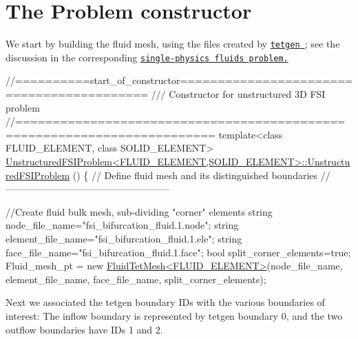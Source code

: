  

\hypertarget{index_constructor}{}\section{The Problem constructor}\label{index_constructor}
We start by building the fluid mesh, using the files created by \href{http://wias-berlin.de/software/tetgen//}{\tt {\ttfamily tetgen} }; see the discussion in the corresponding \href{../../../navier_stokes/unstructured_three_d_fluid/html/index.html#mesh}{\tt single-\/physics fluids problem.}


\begin{DoxyCodeInclude}
\textcolor{comment}{//==========start\_of\_constructor==========================================}
\textcolor{comment}{/// Constructor for unstructured 3D FSI problem}
\textcolor{comment}{}\textcolor{comment}{//========================================================================}
\textcolor{keyword}{template}<\textcolor{keyword}{class} FLUID\_ELEMENT, \textcolor{keyword}{class} SOLID\_ELEMENT>
\hyperlink{classUnstructuredFSIProblem_a6a31fd839e0215ef1312942cf7284bd2}{UnstructuredFSIProblem<FLUID\_ELEMENT,SOLID\_ELEMENT>::UnstructuredFSIProblem}
      ()
\{ 
 \textcolor{comment}{// Define fluid mesh and its distinguished boundaries}
 \textcolor{comment}{//---------------------------------------------------}
 
   \textcolor{comment}{//Create fluid bulk mesh, sub-dividing "corner" elements}
 \textcolor{keywordtype}{string} node\_file\_name=\textcolor{stringliteral}{"fsi\_bifurcation\_fluid.1.node"};
 \textcolor{keywordtype}{string} element\_file\_name=\textcolor{stringliteral}{"fsi\_bifurcation\_fluid.1.ele"};
 \textcolor{keywordtype}{string} face\_file\_name=\textcolor{stringliteral}{"fsi\_bifurcation\_fluid.1.face"};
 \textcolor{keywordtype}{bool} split\_corner\_elements=\textcolor{keyword}{true};
 Fluid\_mesh\_pt =  \textcolor{keyword}{new} \hyperlink{classFluidTetMesh}{FluidTetMesh<FLUID\_ELEMENT>}(node\_file\_name,
                                                  element\_file\_name,
                                                  face\_file\_name,
                                                  split\_corner\_elements);

\end{DoxyCodeInclude}


Next we associated the {\ttfamily tetgen} boundary I\+Ds with the various boundaries of interest\+: The inflow boundary is represented by {\ttfamily tetgen} boundary 0, and the two outflow boundaries have I\+Ds 1 and 2.


